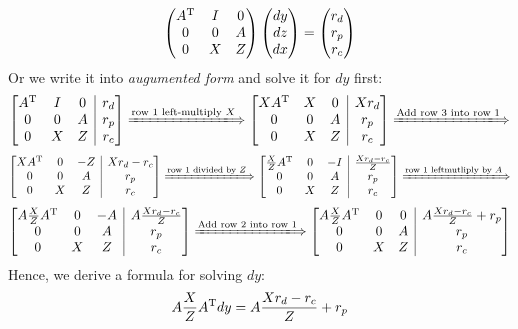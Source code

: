 \begin{itemize}
\[
\begin{pmatrix}
A^{\mathrm T}&I&0\\0&0&A\\0&X&Z
\end{pmatrix}\begin{pmatrix}
dy\\dz\\dx
\end{pmatrix}=\begin{pmatrix}
r_d\\r_p\\r_c
\end{pmatrix}
\]
Or we write it into \emph{augumented form} and solve it for $dy$ first:
\[
\left[
\begin{array}{@{}ccc|c@{}}
A\trans&I&0&r_d\\
0&0&A&r_p\\
0&X&Z&r_c
\end{array} \right]
\xLongrightarrow{\text{row 1 left-multiply $X$}}
\left[
\begin{array}{@{}ccc|c@{}}
X A\trans&X&0&Xr_d\\
0&0&A&r_p\\
0&X&Z&r_c
\end{array} \right]\xLongrightarrow{\text{Add row 3 into row 1}}
\]
\[
\left[
\begin{array}{@{}ccc|c@{}}
X A\trans&0&-Z&Xr_d-r_c\\
0&0&A&r_p\\
0&X&Z&r_c
\end{array} \right]
\xLongrightarrow{\text{row 1 divided by $Z$}}
\left[
\begin{array}{@{}ccc|c@{}}
\frac{X}{Z} A\trans&0&-I&\frac{Xr_d-r_c}{Z}\\
0&0&A&r_p\\
0&X&Z&r_c
\end{array} \right]
\xLongrightarrow{\text{row 1 leftmutliply by $A$}}
\]
\[
\left[
\begin{array}{@{}ccc|c@{}}
A\frac{X}{Z} A\trans&0&-A&A\frac{Xr_d-r_c}{Z}\\
0&0&A&r_p\\
0&X&Z&r_c
\end{array} \right]
\xLongrightarrow{\text{Add row 2 into row 1}}
\left[
\begin{array}{@{}ccc|c@{}}
A\frac{X}{Z} A\trans&0&0&A\frac{Xr_d-r_c}{Z}+r_p\\
0&0&A&r_p\\
0&X&Z&r_c
\end{array} \right]
\]
Hence, we derive a formula for solving $dy$:
\[
A\frac{X}{Z}A^{\mathrm T} dy=A\frac{Xr_d-r_c}{Z}+r_p
\]


\end{itemize}
